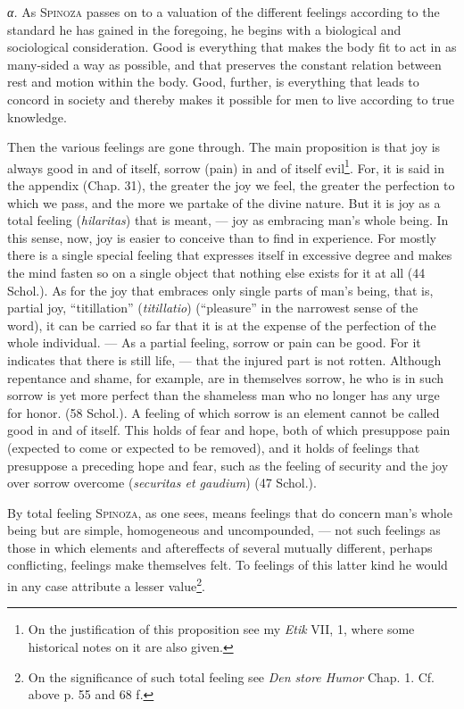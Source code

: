 \documentclass[12pt]{article}
\newcommand{\opage}[1]{\marginnote{\footnotesize\textit{[#1]}}}
\begin{document}
\textit{α.} As \textsc{Spinoza} passes on to a valuation of the different feelings according to the
standard he has gained in the foregoing, he begins with a biological and sociological
consideration. Good is everything that makes the body fit to act in as many-sided a way as
possible, and that preserves the constant relation between rest and motion within the body. Good,
further, is everything that leads to concord in society and thereby makes it possible for men to
live according to true knowledge.

Then the various feelings are gone through. The main proposition is that joy \opage{79}is always
good in and of itself, sorrow (pain) in and of itself evil\footnote{On the justification of this
proposition see my \textit{Etik} VII, 1, where some historical notes on it are also given.}. For,
it is said in the appendix (Chap. 31), the greater the joy we feel, the greater the perfection to
which we pass, and the more we partake of the divine nature. But it is joy as a total feeling
(\textit{hilaritas}) that is meant, --- joy as embracing man's whole being. In this sense, now, joy
is easier to conceive than to find in experience. For mostly there is a single special feeling that
expresses itself in excessive degree and makes the mind fasten so on a single object that nothing
else exists for it at all (44 Schol.). As for the joy that embraces only single parts of man's
being, that is, partial joy, ``titillation'' (\textit{titillatio}) (``pleasure'' in the narrowest
sense of the word), it can be carried so far that it is at the expense of the perfection of the
whole individual. --- As a partial feeling, sorrow or pain can be good. For it indicates that there
is still life, --- that the injured part is not rotten. Although repentance and shame, for example,
are in themselves sorrow, he who is in such sorrow is yet more perfect than the shameless man who
no longer has any urge for honor. (58 Schol.). A feeling of which sorrow is an element cannot be
called good in and of itself. This holds of fear and hope, both of which presuppose pain (expected
to come or expected to be removed), and it holds of feelings that presuppose a preceding hope and
fear, such as the feeling of security and the joy over sorrow overcome (\textit{securitas et
gaudium}) (47 Schol.).

By total feeling \textsc{Spinoza}, as one sees, means feelings that do concern man's whole being but
are simple, homogeneous and uncompounded, --- not such feelings as those in which elements and
aftereffects of several mutually different, perhaps conflicting, feelings make themselves felt. To
feelings of this latter kind he would in any case attribute a lesser value\footnote{On the
significance of such total feeling see \textit{Den store Humor} Chap. 1. Cf. above p. 55 and 68
f.}.
\end{document}

